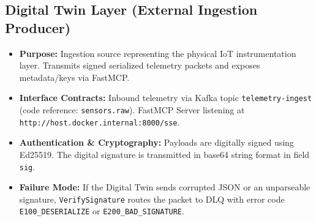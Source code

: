 \documentclass[10pt,a4paper]{report}
\begin{document}
\subsection{Digital Twin Layer (External Ingestion Producer)}
\begin{itemize}[leftmargin=*]
  \item \textbf{Purpose:} Ingestion source representing the physical IoT instrumentation layer. Transmits signed serialized telemetry packets and exposes metadata/keys via FastMCP.
  \item \textbf{Interface Contracts:} Inbound telemetry via Kafka topic \texttt{telemetry-ingest} (code reference: \texttt{sensors.raw}). FastMCP Server listening at \texttt{http://host.docker.internal:8000/sse}.
  \item \textbf{Authentication \& Cryptography:} Payloads are digitally signed using Ed25519. The digital signature is transmitted in base64 string format in field \texttt{sig}.
  \item \textbf{Failure Mode:} If the Digital Twin sends corrupted JSON or an unparseable signature, \texttt{VerifySignature} routes the packet to DLQ with error code \texttt{E100\_DESERIALIZE} or \texttt{E200\_BAD\_SIGNATURE}.
\end{itemize}
\end{document}
